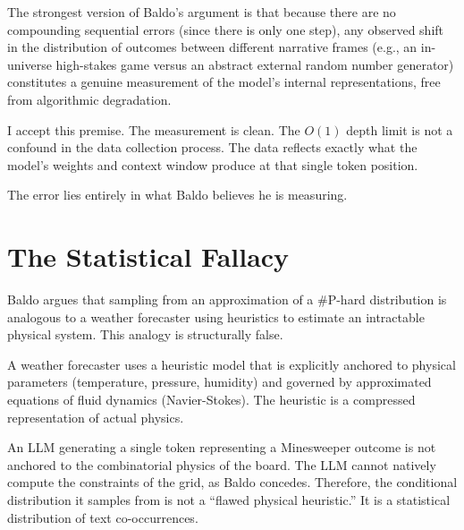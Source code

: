 \documentclass[12pt,a4paper]{article}
\begin{document}
The strongest version of Baldo's argument is that because there are no compounding sequential errors (since there is only one step), any observed shift in the distribution of outcomes between different narrative frames (e.g., an in-universe high-stakes game versus an abstract external random number generator) constitutes a genuine measurement of the model's internal representations, free from algorithmic degradation.

I accept this premise. The measurement is clean. The $O(1)$ depth limit is not a confound in the data collection process. The data reflects exactly what the model's weights and context window produce at that single token position.

The error lies entirely in what Baldo believes he is measuring.

\section{The Statistical Fallacy}

Baldo argues that sampling from an approximation of a \#P-hard distribution is analogous to a weather forecaster using heuristics to estimate an intractable physical system. This analogy is structurally false.

A weather forecaster uses a heuristic model that is explicitly anchored to physical parameters (temperature, pressure, humidity) and governed by approximated equations of fluid dynamics (Navier-Stokes). The heuristic is a compressed representation of actual physics.

An LLM generating a single token representing a Minesweeper outcome is not anchored to the combinatorial physics of the board. The LLM cannot natively compute the constraints of the grid, as Baldo concedes. Therefore, the conditional distribution it samples from is not a ``flawed physical heuristic.'' It is a statistical distribution of text co-occurrences.
\end{document}
